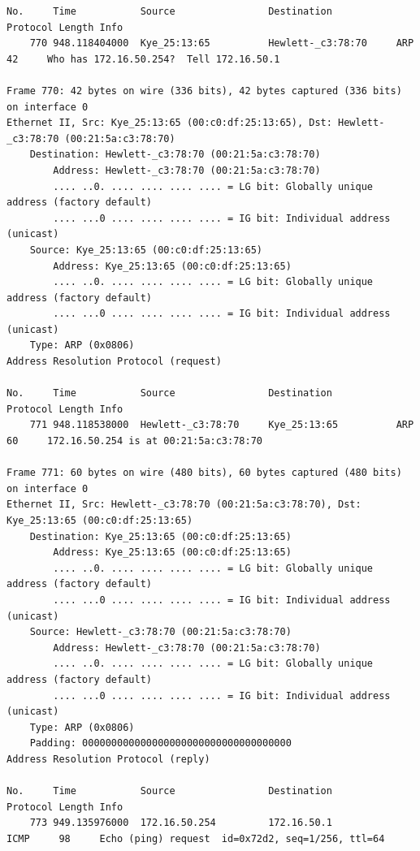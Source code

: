 \documentclass[a4paper,11pt]{article}
\begin{document}
\begin{lstlisting}
No.     Time           Source                Destination           Protocol Length Info
    770 948.118404000  Kye_25:13:65          Hewlett-_c3:78:70     ARP      42     Who has 172.16.50.254?  Tell 172.16.50.1

Frame 770: 42 bytes on wire (336 bits), 42 bytes captured (336 bits) on interface 0
Ethernet II, Src: Kye_25:13:65 (00:c0:df:25:13:65), Dst: Hewlett-_c3:78:70 (00:21:5a:c3:78:70)
    Destination: Hewlett-_c3:78:70 (00:21:5a:c3:78:70)
        Address: Hewlett-_c3:78:70 (00:21:5a:c3:78:70)
        .... ..0. .... .... .... .... = LG bit: Globally unique address (factory default)
        .... ...0 .... .... .... .... = IG bit: Individual address (unicast)
    Source: Kye_25:13:65 (00:c0:df:25:13:65)
        Address: Kye_25:13:65 (00:c0:df:25:13:65)
        .... ..0. .... .... .... .... = LG bit: Globally unique address (factory default)
        .... ...0 .... .... .... .... = IG bit: Individual address (unicast)
    Type: ARP (0x0806)
Address Resolution Protocol (request)

No.     Time           Source                Destination           Protocol Length Info
    771 948.118538000  Hewlett-_c3:78:70     Kye_25:13:65          ARP      60     172.16.50.254 is at 00:21:5a:c3:78:70

Frame 771: 60 bytes on wire (480 bits), 60 bytes captured (480 bits) on interface 0
Ethernet II, Src: Hewlett-_c3:78:70 (00:21:5a:c3:78:70), Dst: Kye_25:13:65 (00:c0:df:25:13:65)
    Destination: Kye_25:13:65 (00:c0:df:25:13:65)
        Address: Kye_25:13:65 (00:c0:df:25:13:65)
        .... ..0. .... .... .... .... = LG bit: Globally unique address (factory default)
        .... ...0 .... .... .... .... = IG bit: Individual address (unicast)
    Source: Hewlett-_c3:78:70 (00:21:5a:c3:78:70)
        Address: Hewlett-_c3:78:70 (00:21:5a:c3:78:70)
        .... ..0. .... .... .... .... = LG bit: Globally unique address (factory default)
        .... ...0 .... .... .... .... = IG bit: Individual address (unicast)
    Type: ARP (0x0806)
    Padding: 000000000000000000000000000000000000
Address Resolution Protocol (reply)

No.     Time           Source                Destination           Protocol Length Info
    773 949.135976000  172.16.50.254         172.16.50.1           ICMP     98     Echo (ping) request  id=0x72d2, seq=1/256, ttl=64


\end{lstlisting}
\end{document}

